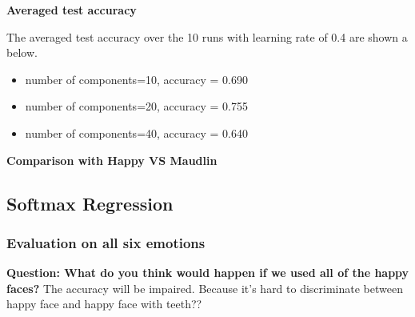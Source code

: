 \documentclass{article} %
\begin{document}
\begin{figure}[htb]
    
\end{figure}

\textbf{Averaged test accuracy}

The averaged test accuracy over the 10 runs with learning rate of 0.4 are shown a below.
\begin{itemize}
    \item number of components=10, accuracy = 0.690
    \item number of components=20, accuracy = 0.755
    \item number of components=40, accuracy = 0.640
\end{itemize}

\textbf{Comparison with Happy VS Maudlin}

\subsection{Softmax Regression}

\subsubsection{Evaluation on all six emotions}

\textbf{Question: What do you think would happen if we used all of the happy faces?}
The accuracy will be impaired. Because it's hard to discriminate between happy face and happy face with teeth??
\end{document}
